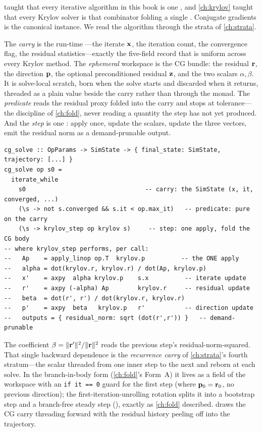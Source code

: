  taught that every iterative algorithm in this book is one
, and \cref{ch:krylov} taught that every Krylov solver is
that combinator folding a single . Conjugate gradients is the
canonical instance. We read the algorithm through the strata of \cref{ch:strata}.

The \emph{carry} is the run-time ---the iterate $\mathbf{x}$, the
iteration count, the convergence flag, the residual statistics---exactly the
five-field record that is uniform across every Krylov method. The
\emph{ephemeral} workspace is the CG  bundle: the residual $\mathbf{r}$, the
direction $\mathbf{p}$, the optional preconditioned residual $\mathbf{z}$, and the two scalars
$\alpha,\beta$. It is solve-local scratch, born when the solve starts and
discarded when it returns, threaded as a plain value beside the carry rather than
through the monad. The \emph{predicate} reads the residual proxy folded into the
carry and stops at tolerance---the discipline of \cref{ch:fold}, never reading a
quantity the step has not yet produced. And the \emph{step} is one
: apply once, update the scalars, update the three vectors,
emit the residual norm as a demand-prunable output.

\begin{lstlisting}[style=l4style]
cg_solve :: OpParams -> SimState -> { final_state: SimState, trajectory: [...] }
cg_solve op s0 =
  iterate_while
    s0                                 -- carry: the SimState (x, it, converged, ...)
    (\s -> not s.converged && s.it < op.max_it)   -- predicate: pure on the carry
    (\s -> krylov_step op krylov s)     -- step: one apply, fold the CG body
-- where krylov_step performs, per call:
--   Ap    = apply_linop op.T  krylov.p          -- the ONE apply
--   alpha = dot(krylov.r, krylov.r) / dot(Ap, krylov.p)
--   x'    = axpy  alpha krylov.p    s.x          -- iterate update
--   r'    = axpy (-alpha) Ap        krylov.r     -- residual update
--   beta  = dot(r', r') / dot(krylov.r, krylov.r)
--   p'    = axpy  beta   krylov.p   r'           -- direction update
--   outputs = { residual_norm: sqrt (dot(r',r')) }   -- demand-prunable
\end{lstlisting}

The coefficient $\beta=\lVert\mathbf{r}'\rVert^2/\lVert\mathbf{r}\rVert^2$ reads the previous step's
residual-norm-squared. That single backward dependence is the
\emph{recurrence carry} of \cref{ch:strata}'s fourth stratum---the scalar
threaded from one inner step to the next and reborn at each solve. In the
branch-in-body form (\cref{ch:fold}'s Form~A) it lives as a field of the workspace
with an \lstinline[style=l4style]|if it == 0| guard for the first step (where
$\mathbf{p}_0=\mathbf{r}_0$, no previous direction); the first-iteration-unrolling rotation
splits it into a bootstrap step and a branch-free steady step
(), exactly as \cref{ch:fold} described.
 draws the CG carry threading forward with the residual history
peeling off into the trajectory.

